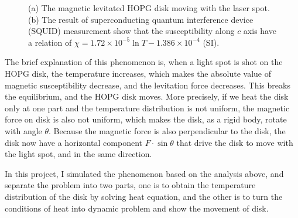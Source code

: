 \documentclass[a4paper,11pt]{article}
\theoremstyle{mytheor}
\begin{document}
\begin{figure}[!htb]
\centering
{}
\caption{(a) The magnetic levitated HOPG disk moving with the laser spot. (b) The result of superconducting quantum interference device (SQUID) measurement show that the susceptibility along $c$ axis have a relation of $\chi = 1.72\times10^{-5}\ln T - 1.386\times 10^{-4}$ (SI).}
\end{figure}

\clearpage

The brief explanation of this phenomenon is, when a light spot is shot on the HOPG disk, the temperature increases, which makes the absolute value of magnetic susceptibility decrease, and the levitation force decreases. This breaks the equilibrium, and the HOPG disk moves. More precisely, if we heat the disk only at one part and the temperature distribution is not uniform, the magnetic force on disk is also not uniform, which makes the disk, as a rigid body, rotate with angle $\theta$. Because the magnetic force is also perpendicular to the disk, the disk now have a horizontal component $F\cdot \sin \theta$ that drive the disk to move with the light spot, and in the same direction.

In this project, I simulated the phenomenon based on the analysis above, and separate the problem into two parts, one is to obtain the temperature distribution of the disk by solving heat equation, and the other is to turn the conditions of heat into dynamic problem and show the movement of disk. 
\end{document}
